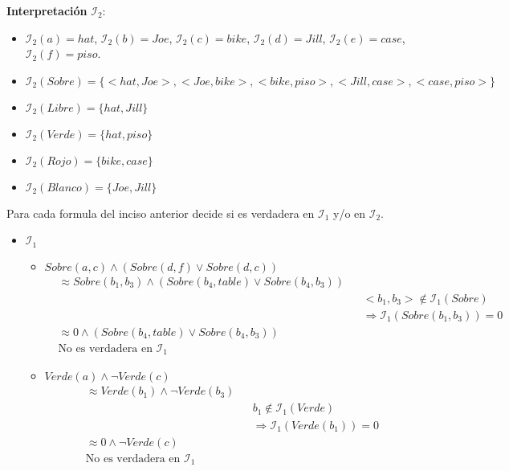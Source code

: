 \documentclass[8pt, letterpaper]{article}
\begin{document}
\begin{enumerate}
  {\bf Interpretación} $\mathcal{I}_2:$

  \begin{itemize}
  \item $\mathcal{I}_2(a) = hat$, $\mathcal{I}_2(b) = Joe$,
    $\mathcal{I}_2(c) = bike$, $\mathcal{I}_2(d) = Jill$,
    $\mathcal{I}_2(e) = case$, $\mathcal{I}_2(f) = piso$.
  \item $\mathcal{I}_2(Sobre) = \{<hat, Joe>, <Joe, bike>, <bike, piso>,
    <Jill, case>, <case, piso>\}$
  \item $\mathcal{I}_2(Libre) = \{hat, Jill\}$
  \item $\mathcal{I}_2(Verde) = \{hat, piso\}$
  \item $\mathcal{I}_2(Rojo) = \{bike, case\}$
  \item $\mathcal{I}_2(Blanco) = \{Joe, Jill\}$
  \end{itemize}
  Para cada formula del inciso anterior decide si es verdadera en
  $\mathcal{I}_1$ y/o en $\mathcal{I}_2$.

  \begin{itemize}
  \item[] $\mathcal{I}_1$
    \begin{itemize}
    \item $Sobre(a, c) \land (Sobre(d, f) \lor Sobre(d, c))$
      \begin{align*}
        &\approx Sobre(b_1, b_3) \land (Sobre(b_4, table)\lor Sobre(b_4, b_3))\\
        & & &<b_1, b_3> \notin \mathcal{I}_1(Sobre)\\
        & & &\Rightarrow \mathcal{I}_1(Sobre(b_1, b_3)) = 0\\
        &\approx 0 \land (Sobre(b_4, table)\lor Sobre(b_4, b_3))\\
        &\text{No es verdadera en } \mathcal{I}_1
      \end{align*}
      
      \hfill\break
    \item $Verde(a) \land \neg Verde(c)$
      \begin{align*}
        &\approx Verde(b_1) \land \neg Verde(b_3)\\
        & & &b_1\notin \mathcal{I}_1(Verde)\\
        & & &\Rightarrow \mathcal{I}_1(Verde(b_1)) = 0\\
        &\approx 0 \land \neg Verde(c)\\
        &\text{No es verdadera en } \mathcal{I}_1
      \end{align*}
      

\end{itemize}
\end{itemize}
\end{enumerate}
\end{document}
